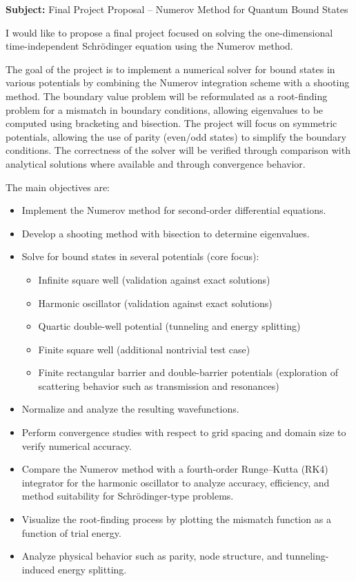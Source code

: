 \documentclass[11pt]{article}
\begin{document}
\noindent
\textbf{Subject:} Final Project Proposal – Numerov Method for Quantum Bound States

\vspace{0.5cm}

I would like to propose a final project focused on solving the one-dimensional time-independent Schrödinger equation using the Numerov method.

The goal of the project is to implement a numerical solver for bound states in various potentials by combining the Numerov integration scheme with a shooting method. The boundary value problem will be reformulated as a root-finding problem for a mismatch in boundary conditions, allowing eigenvalues to be computed using bracketing and bisection. The project will focus on symmetric potentials, allowing the use of parity (even/odd states) to simplify the boundary conditions. The correctness of the solver will be verified through comparison with analytical solutions where available and through convergence behavior.

The main objectives are:
\begin{itemize}
    \item Implement the Numerov method for second-order differential equations.
    \item Develop a shooting method with bisection to determine eigenvalues.
    \item Solve for bound states in several potentials (core focus):
    \begin{itemize}
        \item Infinite square well (validation against exact solutions)
        \item Harmonic oscillator (validation against exact solutions)
        \item Quartic double-well potential (tunneling and energy splitting)
        \item Finite square well (additional nontrivial test case)
        \item Finite rectangular barrier and double-barrier potentials (exploration of scattering behavior such as transmission and resonances)
    \end{itemize}
    \item Normalize and analyze the resulting wavefunctions.
    \item Perform convergence studies with respect to grid spacing and domain size to verify numerical accuracy.
    \item Compare the Numerov method with a fourth-order Runge--Kutta (RK4) integrator for the harmonic oscillator to analyze accuracy, efficiency, and method suitability for Schrödinger-type problems.
    \item Visualize the root-finding process by plotting the mismatch function as a function of trial energy.
    \item Analyze physical behavior such as parity, node structure, and tunneling-induced energy splitting.
\end{itemize}
\end{document}
